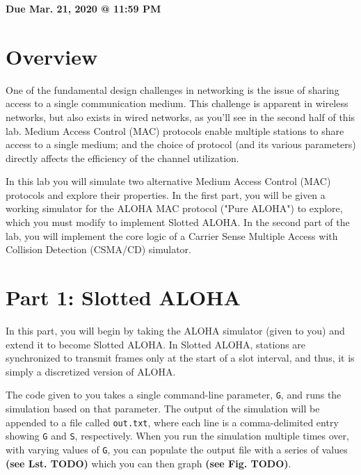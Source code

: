 \documentclass[11pt]{article}
\makeatletter
\def\datedue{Mar. 21, 2020 @ 11:59 PM}
\makeatother
\begin{document}
\maketitle \thispagestyle{fancy}

\hfill {\large \textbf{Due \datedue}}


\section{Overview}
\label{sec:overview}
One of the fundamental design challenges in networking is the issue of sharing access to a single communication medium.
This challenge is apparent in wireless networks, but also exists in wired networks, as you’ll see in the second half of this lab.
Medium Access Control (MAC) protocols enable multiple stations to share access to a single medium; and the choice of protocol (and its various parameters) directly affects the efficiency of the channel utilization.

In this lab you will simulate two alternative Medium Access Control (MAC) protocols and explore their properties.
In the first part, you will be given a working simulator for the ALOHA MAC protocol ("Pure ALOHA") to explore, which you must modify to implement Slotted ALOHA.
In the second part of the lab, you will implement the core logic of a Carrier Sense Multiple Access with Collision Detection (CSMA/CD) simulator.


\section{Part 1: Slotted ALOHA}
\label{sec:sotted-aloha}
In this part, you will begin by taking the ALOHA simulator (given to you) and extend it to become Slotted ALOHA.
In Slotted ALOHA, stations are synchronized to transmit frames only at the start of a slot interval, and thus, it is simply a discretized version of ALOHA.

The code given to you takes a single command-line parameter, \texttt{G}, and runs the simulation based on that parameter.
The output of the simulation will be appended to a file called \texttt{out.txt}, where each line is a comma-delimited entry showing \texttt{G} and \texttt{S}, respectively.
When you run the simulation multiple times over, with varying values of \texttt{G}, you can populate the output file with a series of values \textbf{(see Lst. TODO)} which you can then graph \textbf{(see Fig. TODO)}.
\end{document}
